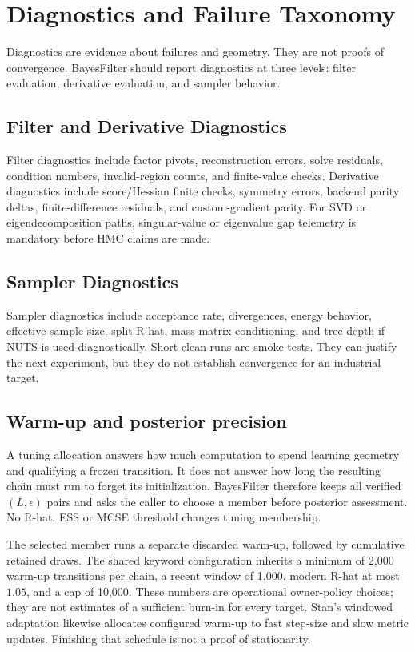 \chapter{Diagnostics and Failure Taxonomy}
\label{ch:bf-diagnostics}

Diagnostics are evidence about failures and geometry.  They are not proofs of
convergence.  BayesFilter should report diagnostics at three levels: filter
evaluation, derivative evaluation, and sampler behavior.

\section{Filter and Derivative Diagnostics}
\label{sec:bf-filter-derivative-diagnostics}

Filter diagnostics include factor pivots, reconstruction errors, solve
residuals, condition numbers, invalid-region counts, and finite-value checks.
Derivative diagnostics include score/Hessian finite checks, symmetry errors,
backend parity deltas, finite-difference residuals, and custom-gradient parity.
For SVD or eigendecomposition paths, singular-value or eigenvalue gap telemetry
is mandatory before HMC claims are made.

\section{Sampler Diagnostics}
\label{sec:bf-sampler-diagnostics}

Sampler diagnostics include acceptance rate, divergences, energy behavior,
effective sample size, split R-hat, mass-matrix conditioning, and tree depth if
NUTS is used diagnostically.  Short clean runs are smoke tests.  They can justify
the next experiment, but they do not establish convergence for an industrial
target.

\section{Warm-up and posterior precision}

A tuning allocation answers how much computation to spend learning geometry
and qualifying a frozen transition. It does not answer how long the resulting
chain must run to forget its initialization. BayesFilter therefore keeps all
verified $(L,\epsilon)$ pairs and asks the caller to choose a member before
posterior assessment. No R-hat, ESS or MCSE threshold changes tuning membership.

The selected member runs a separate discarded warm-up, followed by cumulative
retained draws. The shared keyword configuration inherits a minimum of 2,000
warm-up transitions per chain, a recent window of 1,000, modern R-hat at most
$1.05$, and a cap of 10,000. These numbers are operational owner-policy choices;
they are not estimates of a sufficient burn-in for every target. Stan's
windowed adaptation likewise allocates configured warm-up to fast step-size
and slow metric updates. Finishing that schedule is not a proof of stationarity.


